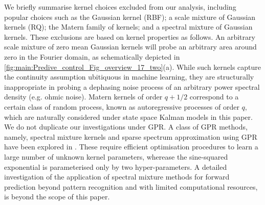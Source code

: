 We briefly summarise kernel choices excluded from our analysis, including popular choices such as the Gaussian kernel (RBF); a scale mixture of Gaussian kernels (RQ); the Matern family of kernels; and a spectral mixture of Gaussian kernels. These exclusions are based on kernel properties as follows. An arbitrary scale mixture of zero mean Gaussian kernels will probe an arbitrary area around zero in the Fourier domain, as schematically depicted in \cref{fig:main:Predive_control_Fig_overview_17_two}(a). While such kernels capture the continuity assumption ubitiquous in machine learning, they are structurally inappropriate in probing a dephasing noise process of an arbitrary power spectral density (e.g. ohmic noise).  Matern kernels of order $q + 1/2$ correspond to a certain class of random process, known as autoregressive processes of order $q$, which are naturally considered under state space Kalman models in this paper. We do not duplicate our investigations under GPR. A class of GPR methods, namely, spectral mixture kernels and sparse spectrum approximation using GPR have been explored in \cite{wilson2013, quia2010}. These require efficient optimisation procedures to learn a large number of unknown kernel parameters, wherease the sine-squared exponential is parameterised only by two hyper-parameters. A detailed investigation of the application of  spectral mixture methods for forward prediction beyond pattern recognition and with limited computational resources, is beyond the scope of this paper.  

